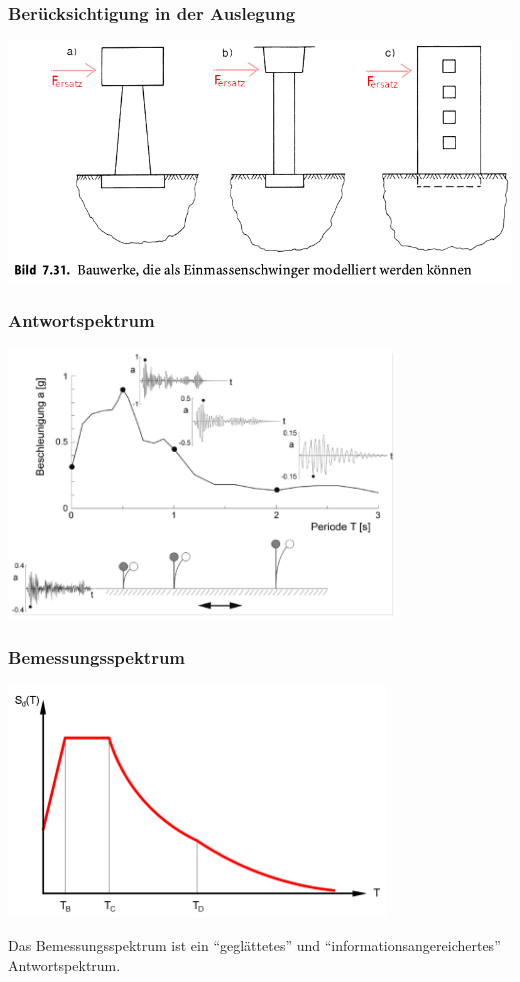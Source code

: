 \begin{frame}
\frametitle{Berücksichtigung in der Auslegung}
\includegraphics[width=\textwidth]{fig_img/einmassenmodell_erdbeben}

\end{frame}


\begin{frame}
\frametitle{Antwortspektrum}  %
\includegraphics[width=0.77\textwidth]{fig_img/antwortspektrum} %
\end{frame}


\begin{frame}
\frametitle{Bemessungsspektrum}  %
\includegraphics[width=0.75\textwidth]{fig_img/bemessungsspektrum} %

Das Bemessungsspektrum ist ein ``geglättetes'' und ``informationsangereichertes'' Antwortspektrum. 
\end{frame}

